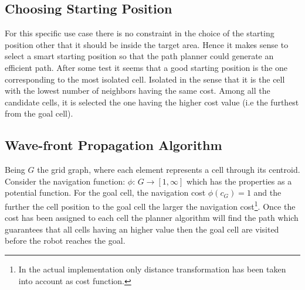 \subsection{Choosing Starting Position} %
\label{sub:choosing_starting_position}
For this specific use case there is no constraint in the choice of the starting position other that it should be inside the target area. Hence it makes sense to select a smart starting position so that the path planner could generate an efficient path. After some test it seems that a good starting position is the one corresponding to the most isolated cell. Isolated in the sense that it is the cell with the lowest number of neighbors having the same cost. Among all the candidate cells, it is selected the one having the higher cost value (i.e the furthest from the goal cell).

\subsection{Wave-front Propagation Algorithm} %
\label{sub:wave_front_propagation_algorithm}
Being $G$ the grid graph, where each element represents a cell through its centroid.
Consider the navigation function: $\phi:\, G \rightarrow [1, \infty]$ which has the properties as a potential function. For the goal cell, the navigation cost $\phi(c_G)=1$ and the further the cell position to the goal cell the larger the navigation cost\footnote{In the actual implementation only distance transformation has been taken into account as cost function.}.
Once the cost has been assigned to each cell the planner algorithm will find the path which guarantees that all cells having an higher value then the goal cell are visited before the robot reaches the goal.\par

